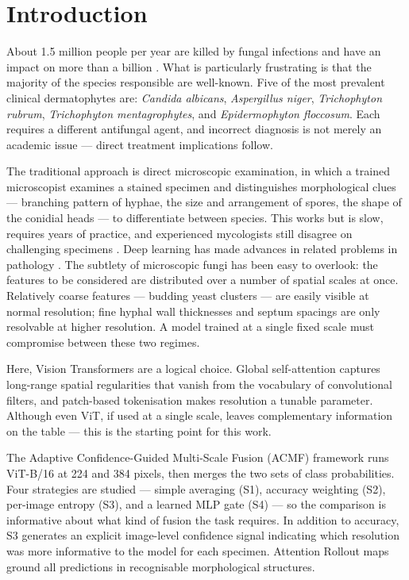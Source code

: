 \documentclass[conference]{IEEEtran}
\begin{document}
\section{Introduction}

About 1.5 million people per year are killed by fungal infections and have
an impact on more than a billion \cite{kainz2020}. What is particularly
frustrating is that the majority of the species responsible are well-known.
Five of the most prevalent clinical dermatophytes are: \textit{Candida
albicans}, \textit{Aspergillus niger}, \textit{Trichophyton rubrum},
\textit{Trichophyton mentagrophytes}, and \textit{Epidermophyton floccosum}.
Each requires a different antifungal agent, and incorrect diagnosis is not
merely an academic issue --- direct treatment implications follow.

The traditional approach is direct microscopic examination, in which a
trained microscopist examines a stained specimen and distinguishes
morphological clues --- branching pattern of hyphae, the size and arrangement
of spores, the shape of the conidial heads --- to differentiate between
species. This works but is slow, requires years of practice, and experienced
mycologists still disagree on challenging specimens \cite{verweij2015}. Deep
learning has made advances in related problems in pathology
\cite{srinidhi2021}. The subtlety of microscopic fungi has been easy to
overlook: the features to be considered are distributed over a number of
spatial scales at once. Relatively coarse features --- budding yeast clusters
--- are easily visible at normal resolution; fine hyphal wall thicknesses and
septum spacings are only resolvable at higher resolution. A model trained at
a single fixed scale must compromise between these two regimes.

Here, Vision Transformers \cite{dosovitskiy2021} are a logical choice. Global
self-attention captures long-range spatial regularities that vanish from the
vocabulary of convolutional filters, and patch-based tokenisation makes
resolution a tunable parameter. Although even ViT, if used at a single scale,
leaves complementary information on the table --- this is the starting point
for this work.

The Adaptive Confidence-Guided Multi-Scale Fusion (ACMF) framework runs
ViT-B/16 at 224 and 384 pixels, then merges the two sets of class
probabilities. Four strategies are studied --- simple averaging (S1), accuracy
weighting (S2), per-image entropy (S3), and a learned MLP gate (S4) --- so
the comparison is informative about what kind of fusion the task requires.
In addition to accuracy, S3 generates an explicit image-level confidence
signal indicating which resolution was more informative to the model for each
specimen. Attention Rollout maps \cite{abnar2020} ground all predictions in
recognisable morphological structures.
\end{document}
